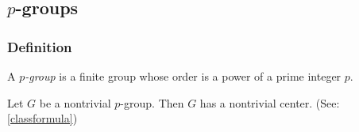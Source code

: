 \subsection{$p$-groups}\label{pgroups}

\subsubsection{Definition}
A \emph{$p$-group} is a finite group whose order is a power of a prime integer $p$.

\begin{corollary}
Let $G$ be a nontrivial $p$-group. Then $G$ has a nontrivial center. (See: \ref{classformula})
\end{corollary}
